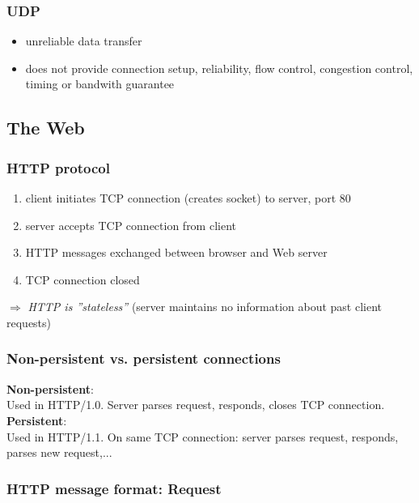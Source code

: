\documentclass[10pt, a4paper, twocolumn]{scrartcl}
\begin{document}
\subsubsection{UDP}

\begin{itemize}
	\item unreliable data transfer
	\item does not provide connection setup, reliability, flow control, congestion control, timing or bandwith guarantee
\end{itemize}

\subsection{The Web}

\subsubsection{HTTP protocol}

\begin{enumerate}
	\item client initiates TCP connection (creates socket) to server, port 80
	\item server accepts TCP connection from client
	\item HTTP messages exchanged between browser and Web server
	\item TCP connection closed
\end{enumerate}

$\Rightarrow$ \textit{HTTP is ''stateless''} (server maintains no information about past client requests)

\subsubsection{Non-persistent vs. persistent connections}

\textbf{Non-persistent}:\\
Used in HTTP/1.0. Server parses request, responds, closes TCP connection.\\

\textbf{Persistent}:\\
Used in HTTP/1.1. On same TCP connection: server parses request, responds, parses new request,...

\subsubsection{HTTP message format: Request}
\end{document}
